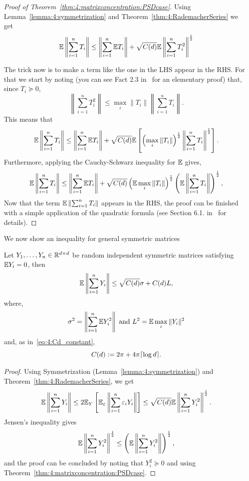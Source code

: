 \begin{proof}[Proof of Theorem~\ref{thm:4:matrixconcentration:PSDcase}]

Using Lemma~\ref{lemma:4:symmetrization} and Theorem~\ref{thm:4:RademacherSeries} we get
\[
\mathbb{E} \left\| \sum_{i=1}^n T_i  \right\| \leq \left\| \sum_{i=1}^n \mathbb{E} T_i \right\| + \sqrt{C(d)} \mathbb{E} \left\| \sum_{i=1}^n T_i^2  \right\|^{\frac12}
\]

The trick now is to make a term like the one in the LHS appear in the RHS. For that we start by noting (you can see Fact 2.3 in~\cite{Tropp_MatrixConcentrationElementary} for an elementary proof) that, since $T_i\succeq 0$,
\[
\left\| \sum_{i=1}^n T_i^2  \right\| \leq \max_i \| T_i\|   \left\| \sum_{i=1}^n T_i  \right\|.
\]
This means that
\[
\mathbb{E} \left\| \sum_{i=1}^n T_i  \right\| \leq \left\| \sum_{i=1}^n \mathbb{E} T_i \right\| + \sqrt{C(d)} \mathbb{E} \left[ \left(  \max_i \| T_i\| \right)^{\frac12} \left\| \sum_{i=1}^n T_i  \right\|^{\frac12} \right].
\]
Furthermore, applying the Cauchy-Schwarz inequality for $\mathbb{E}$ gives,
\[
\mathbb{E} \left\| \sum_{i=1}^n T_i  \right\| \leq \left\| \sum_{i=1}^n \mathbb{E} T_i \right\| + \sqrt{C(d)}  \left( \mathbb{E} \max_i \| T_i\| \right)^{\frac12} \left( \mathbb{E} \left\| \sum_{i=1}^n T_i  \right\|\right)^{\frac12},
\]
Now that the term $\mathbb{E} \left\| \sum_{i=1}^n T_i  \right\|$ appears in the RHS, the proof can be finished with a simple application of the quadratic formula (see Section 6.1. in~\cite{Tropp_MatrixConcentrationElementary} for details).

\end{proof}

We now show an inequality for general symmetric matrices

\begin{theorem}\label{thm:4:matrixconsymmetric}
Let $Y_1,\dots,Y_n\in\mathbb{R}^{d\times d}$ be random independent symmetric matrices satisfying $\mathbb{E} Y_i=0$, then
\[
\mathbb{E} \left\| \sum_{i=1}^n Y_i  \right\| \leq \sqrt{C(d)}\sigma  + C(d) L,
\]
where,
\begin{equation}
\sigma^2 = \left\|  \sum_{i=1}^n \mathbb{E} Y_i^2   \right\| \text{ and } L^2 = \mathbb{E} \max_i \| Y_i\|^2
\end{equation}
and, as in~\eqref{eq:4:Cd_constant},
\begin{equation*}
C(d) \mathrel{\mathop:}= 2\pi + 4\pi\lceil \log d \rceil.
\end{equation*}
\end{theorem}

\begin{proof}

Using Symmetrization (Lemma~\ref{lemma:4:symmetrization}) and Theorem~\ref{thm:4:RademacherSeries}, we get
\[
\mathbb{E} \left\| \sum_{i=1}^n Y_i  \right\| \leq 2 \mathbb{E}_Y \left[  \mathbb{E}_\varepsilon \left\|   \sum_{i=1}^n \varepsilon_i Y_i \right\| \right] \leq \sqrt{C(d)} \mathbb{E} \left\| \sum_{i=1}^n Y_i^2  \right\|^{\frac12}.
\]
Jensen's inequality gives
\[
\mathbb{E} \left\| \sum_{i=1}^n Y_i^2  \right\|^{\frac12} \leq \left( \mathbb{E} \left\| \sum_{i=1}^n Y_i^2  \right\| \right)^{\frac12},
\]
and the proof can be concluded by noting that $Y_i^2\succeq 0$ and using Theorem~\ref{thm:4:matrixconcentration:PSDcase}.
\end{proof}

